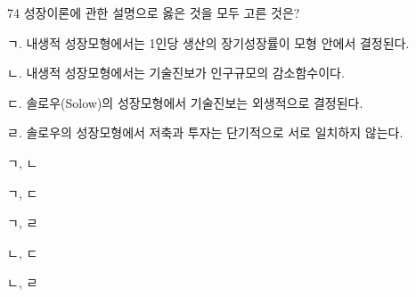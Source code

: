 \begin{question}{74}
성장이론에 관한 설명으로 옳은 것을 모두 고른 것은?
\begin{framedtext}
ㄱ. 내생적 성장모형에서는 1인당 생산의 장기성장률이 모형 안에서 결정된다. \par
ㄴ. 내생적 성장모형에서는 기술진보가 인구규모의 감소함수이다. \par
ㄷ. 솔로우(Solow)의 성장모형에서 기술진보는 외생적으로 결정된다. \par
ㄹ. 솔로우의 성장모형에서 저축과 투자는 단기적으로 서로 일치하지 않는다.
\end{framedtext}
\begin{choices}
  \item ㄱ, ㄴ
  \item ㄱ, ㄷ
  \item ㄱ, ㄹ
  \item ㄴ, ㄷ
  \item ㄴ, ㄹ
\end{choices}
\end{question}

